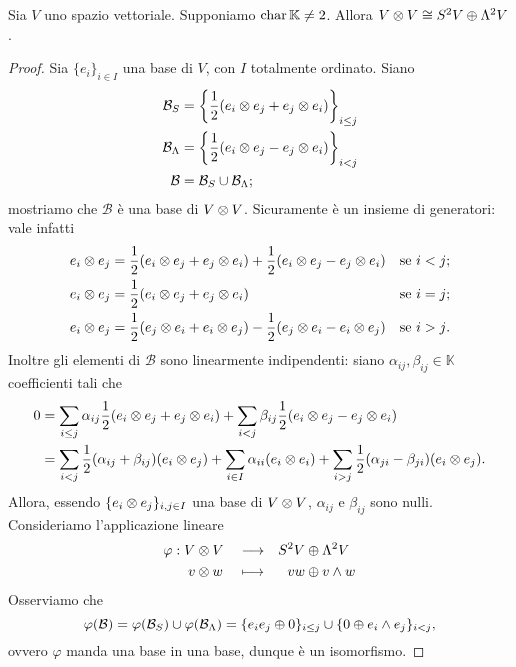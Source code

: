 \begin{proposition}
Sia $V$ uno spazio vettoriale. Supponiamo $\operatorname{char}\mathbb{K}\neq 2$. Allora $V\otimes V\cong S^2 V\oplus\Lambda^2 V$.
\end{proposition}
\begin{proof}
Sia $\{e_i\}_{i\in I}$ una base di $V$, con $I$ totalmente ordinato. Siano
\begin{align*}
\mathcal{B}_S&=\left\{\frac{1}{2}(e_i\otimes e_j+e_j\otimes e_i)\right\}_{i\le j}\\
\mathcal{B}_\Lambda&=\left\{\frac{1}{2}(e_i\otimes e_j-e_j\otimes e_i)\right\}_{i<j}\\
\mathcal{B}&=\mathcal{B}_S\cup\mathcal{B}_\Lambda;
\end{align*}
mostriamo che $\mathcal{B}$ è una base di $V\otimes V$. Sicuramente è un insieme di generatori: vale infatti
\begin{align*}
e_i\otimes e_j&=\frac{1}{2}(e_i\otimes e_j+e_j\otimes e_i)+\frac{1}{2}(e_i\otimes e_j-e_j\otimes e_i)&\text{se $i<j$};\\
e_i\otimes e_j&=\frac{1}{2}(e_i\otimes e_j+e_j\otimes e_i)&\text{se $i=j$};\\
e_i\otimes e_j&=\frac{1}{2}(e_j\otimes e_i+e_i\otimes e_j)-\frac{1}{2}(e_j\otimes e_i-e_i\otimes e_j)&\text{se $i>j$}.
\end{align*}
Inoltre gli elementi di $\mathcal{B}$ sono linearmente indipendenti: siano $\alpha_{ij},\beta_{ij}\in\mathbb{K}$ coefficienti tali che
\begin{align*}
0&=\sum_{i\le j}\alpha_{ij}\frac{1}{2}(e_i\otimes e_j+e_j\otimes e_i)+\sum_{i<j}\beta_{ij}\frac{1}{2}(e_i\otimes e_j-e_j\otimes e_i)\\
&=\sum_{i<j}\frac{1}{2}(\alpha_{ij}+\beta_{ij})(e_i\otimes e_j)+\sum_{i\in I}\alpha_{ii}(e_i\otimes e_i)+\sum_{i>j}\frac{1}{2}(\alpha_{ji}-\beta_{ji})(e_i\otimes e_j).
\end{align*}
Allora, essendo $\{e_i\otimes e_j\}_{i,j\in I}$ una base di $V\otimes V$, $\alpha_{ij}$ e $\beta_{ij}$ sono nulli.\\
Consideriamo l'applicazione lineare
\begin{alignat*}{3}
\varphi:V&\otimes V&&\longrightarrow&S^2V&\oplus\Lambda^2V\\
v&\otimes w&&\longmapsto& vw&\oplus v\wedge w
\end{alignat*}
Osserviamo che
$$
\varphi(\mathcal{B})=\varphi(\mathcal{B}_S)\cup\varphi(\mathcal{B}_\Lambda)=\{e_ie_j\oplus0\}_{i\le j}\cup\{0\oplus e_i\wedge e_j\}_{i<j},
$$
ovvero $\varphi$ manda una base in una base, dunque è un isomorfismo.
\end{proof}
